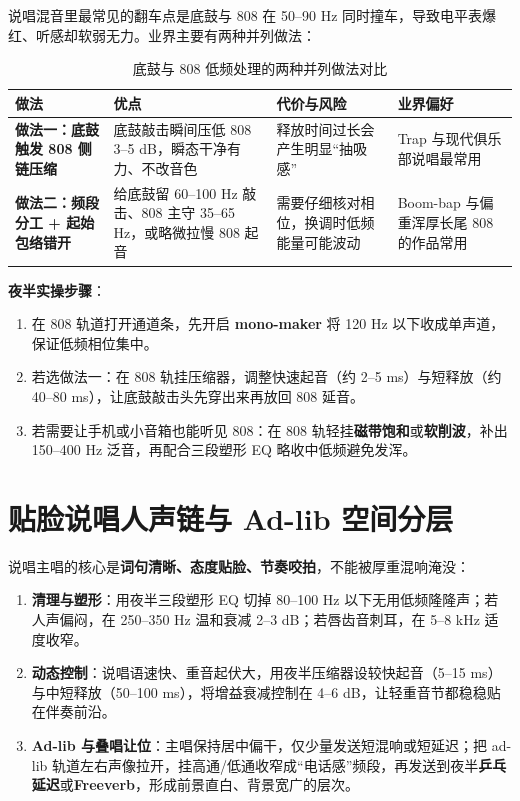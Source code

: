 说唱混音里最常见的翻车点是底鼓与 808 在 50--90 Hz 同时撞车，导致电平表爆红、听感却软弱无力。业界主要有两种并列做法：

\begin{table}[htbp]
\centering
\begin{tabular}{p{}p{}p{}p{}}
\toprule
做法 & 优点 & 代价与风险 & 业界偏好 \\
\midrule
\textbf{做法一：底鼓触发 808 侧链压缩} & 底鼓敲击瞬间压低 808 3--5 dB，瞬态干净有力、不改音色 & 释放时间过长会产生明显“抽吸感” & Trap 与现代俱乐部说唱最常用 \\
\textbf{做法二：频段分工 + 起始包络错开} & 给底鼓留 60--100 Hz 敲击、808 主守 35--65 Hz，或略微拉慢 808 起音 & 需要仔细核对相位，换调时低频能量可能波动 & Boom-bap 与偏重浑厚长尾 808 的作品常用 \\
\bottomrule
\end{tabular}
\caption{底鼓与 808 低频处理的两种并列做法对比}
\end{table}

\textbf{夜半实操步骤}：
\begin{enumerate}
  \item 在 808 轨道打开通道条，先开启 \textbf{mono-maker} 将 120 Hz 以下收成单声道，保证低频相位集中。
  \item 若选做法一：在 808 轨挂压缩器，调整快速起音（约 2--5 ms）与短释放（约 40--80 ms），让底鼓敲击头先穿出来再放回 808 延音。
  \item 若需要让手机或小音箱也能听见 808：在 808 轨轻挂\textbf{磁带饱和}或\textbf{软削波}，补出 150--400 Hz 泛音，再配合三段塑形 EQ 略收中低频避免发浑。
\end{enumerate}

\section{贴脸说唱人声链与 Ad-lib 空间分层}

说唱主唱的核心是\textbf{词句清晰、态度贴脸、节奏咬拍}，不能被厚重混响淹没：
\begin{enumerate}
  \item \textbf{清理与塑形}：用夜半三段塑形 EQ 切掉 80--100 Hz 以下无用低频隆隆声；若人声偏闷，在 250--350 Hz 温和衰减 2--3 dB；若唇齿音刺耳，在 5--8 kHz 适度收窄。
  \item \textbf{动态控制}：说唱语速快、重音起伏大，用夜半压缩器设较快起音（5--15 ms）与中短释放（50--100 ms），将增益衰减控制在 4--6 dB，让轻重音节都稳稳贴在伴奏前沿。
  \item \textbf{Ad-lib 与叠唱让位}：主唱保持居中偏干，仅少量发送短混响或短延迟；把 ad-lib 轨道左右声像拉开，挂高通/低通收窄成“电话感”频段，再发送到夜半\textbf{乒乓延迟}或\textbf{Freeverb}，形成前景直白、背景宽广的层次。
\end{enumerate}

